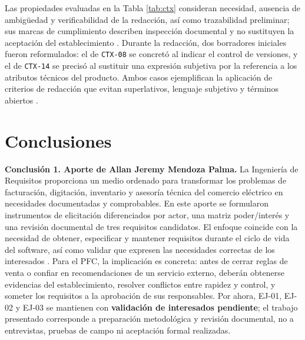 \documentclass[onecolumn,12pt,a4paper]{IEEEtran}
\begin{document}
Las propiedades evaluadas en la Tabla \ref{tab:ctx} consideran necesidad, ausencia de ambig\"uedad y verificabilidad de la redacci\'on, as\'i como trazabilidad preliminar; sus marcas de cumplimiento describen inspecci\'on documental y no sustituyen la aceptaci\'on del establecimiento \cite{iso29148}. Durante la redacci\'on, dos borradores iniciales fueron reformulados: el de \texttt{CTX-08} se concret\'o al indicar el control de versiones, y el de \texttt{CTX-14} se precis\'o al sustituir una expresi\'on subjetiva por la referencia a los atributos t\'ecnicos del producto. Ambos casos ejemplifican la aplicaci\'on de criterios de redacci\'on que evitan superlativos, lenguaje subjetivo y t\'erminos abiertos \cite{iso29148}.

\clearpage
\section*{Conclusiones}
\noindent\textbf{Conclusión 1. Aporte de Allan Jeremy Mendoza Palma.}
La Ingeniería de Requisitos proporciona un medio ordenado para transformar los problemas de facturación, digitación, inventario y asesoría técnica del comercio eléctrico en necesidades documentadas y comprobables. En este aporte se formularon instrumentos de elicitación diferenciados por actor, una matriz poder/interés y una revisión documental de tres requisitos candidatos. El enfoque coincide con la necesidad de obtener, especificar y mantener requisitos durante el ciclo de vida del software, así como validar que expresen las necesidades correctas de los interesados \cite{iso29148,pohl2025,swebok4}. Para el PFC, la implicación es concreta: antes de cerrar reglas de venta o confiar en recomendaciones de un servicio externo, deberán obtenerse evidencias del establecimiento, resolver conflictos entre rapidez y control, y someter los requisitos a la aprobación de sus responsables. Por ahora, EJ-01, EJ-02 y EJ-03 se mantienen con \textbf{validación de interesados pendiente}; el trabajo presentado corresponde a preparación metodológica y revisión documental, no a entrevistas, pruebas de campo ni aceptación formal realizadas.
\end{document}
